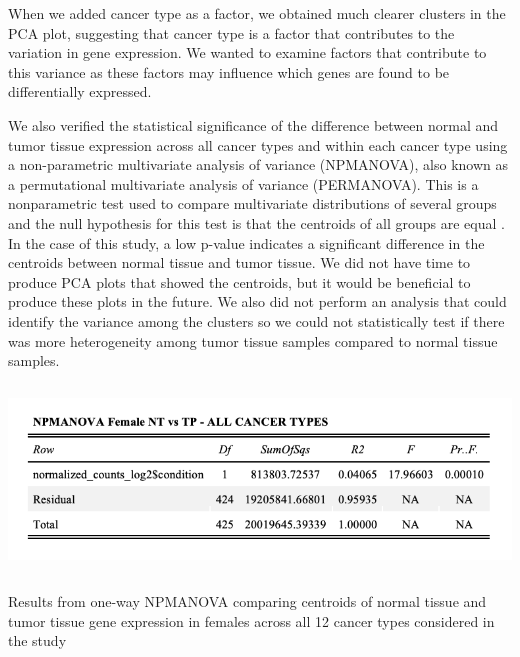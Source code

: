 \documentclass[10pt]{article}
\begin{document}
	When we added cancer type as a factor, we obtained much clearer clusters in the PCA plot, suggesting that cancer type is a factor that contributes to the variation in gene expression. We wanted to examine factors that contribute to this variance as these factors may influence which genes are found to be differentially expressed. 
	
	We also verified the statistical significance of the difference between normal and tumor tissue expression across all cancer types and within each cancer type using a non-parametric multivariate analysis of variance (NPMANOVA), also known as a permutational multivariate analysis of variance (PERMANOVA). This is a nonparametric test used to compare multivariate distributions of several groups and the null hypothesis for this test is that the centroids of all groups are equal \citep{anderson2005permutational}. In the case of this study, a low p-value indicates a significant difference in the centroids between normal tissue and tumor tissue. We did not have time to produce PCA plots that showed the centroids, but it would be beneficial to produce these plots in the future. We also did not perform an analysis that could identify the variance among the clusters so we could not statistically test if there was more heterogeneity among tumor tissue samples compared to normal tissue samples. \newline
	
	\begin{table}[!h]
		\centering
		\vspace{-0.2cm}\includegraphics[width=18cm, height=5cm]{allfemale_npmanova.png}
		\caption{Results from one-way NPMANOVA comparing centroids of normal tissue and tumor tissue gene expression in females across all 12 cancer types considered in the study}
		\label{table:2}
	\end{table}
\end{document}
